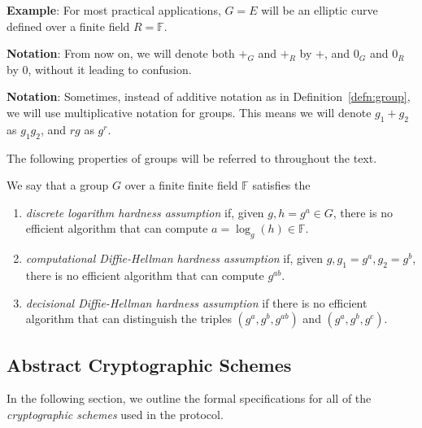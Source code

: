 \textbf{Example}: For most practical applications, $G = E$ will be an elliptic curve defined over a finite field $R = \mathbb{F}$.

\textbf{Notation}: From now on, we will denote both $+_G$ and $+_R$ by $+$, and $0_G$ and $0_R$ by $0$, without it leading to confusion. 

\textbf{Notation}: Sometimes, instead of additive notation as in Definition~\ref{defn:group}, we will use multiplicative notation for groups. This means we will denote $g_1 + g_2$ as $g_1 g_2$, and $r g$ as $g^r$. 

The following properties of groups will be referred to throughout the text. 

\begin{definition} We say that a group $G$ over a finite finite field $\mathbb{F}$ satisfies the
    \begin{enumerate}
        \item \emph{discrete logarithm hardness assumption} if, given $g, h=g^a \in G$, there is no efficient algorithm that can compute $a = \log_g (h) \in \mathbb{F}$.
        \item \emph{computational Diffie-Hellman hardness assumption} if, given $g, g_1 = g^a, g_2 = g^b$, there is no efficient algorithm that can compute $g^{ab}$.
        \item \emph{decisional Diffie-Hellman hardness assumption} if there is no efficient algorithm that can distinguish the triples $(g^a, g^b, g^{ab})$ and $(g^a, g^b, g^c)$.
    \end{enumerate}
    
\end{definition}

\subsection{Abstract Cryptographic Schemes}

In the following section, we outline the formal specifications for all of the \emph{cryptographic schemes} used in the \MantaPay{} protocol.

